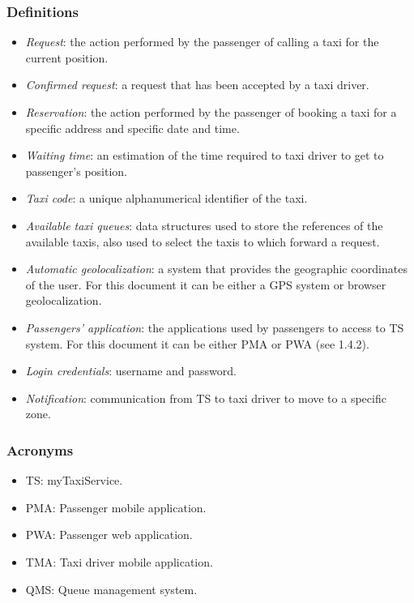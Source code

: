 \subsubsection{Definitions}
\begin{itemize}
\item \emph{Request}: the action performed by the passenger of calling a
taxi for the current position.
\item \emph{Confirmed request}: a request that has been accepted by a taxi
driver.
\item \emph{Reservation}: the action performed by the passenger of booking
a taxi for a specific address and specific date and time.
\item \emph{Waiting time}: an estimation of the time required to taxi driver
to get to passenger's position.
\item \emph{Taxi code}: a unique alphanumerical identifier of the taxi.
\item \emph{Available taxi queues}: data structures used to store the references
of the available taxis, also used to select the taxis to which forward
a request.
\item \emph{Automatic geolocalization}: a system that provides the geographic
coordinates of the user. For this document it can be either a GPS
system or browser geolocalization.
\item \emph{Passengers' application}: the applications used by passengers
to access to TS system. For this document it can be either PMA or
PWA (see 1.4.2).
\item \emph{Login credentials}: username and password.
\item \textit{Notification}: communication from TS to taxi driver to move
to a specific zone.
\end{itemize}

\subsubsection{Acronyms}
\begin{itemize}
\item TS: myTaxiService.
\item PMA: Passenger mobile application.
\item PWA: Passenger web application.
\item TMA: Taxi driver mobile application.
\item QMS: Queue management system.
\end{itemize}


